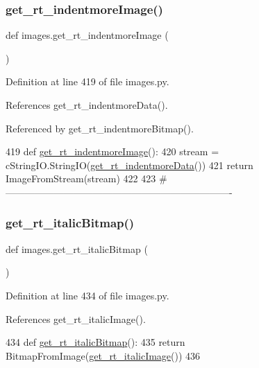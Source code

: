 \subsubsection{\texorpdfstring{get\+\_\+rt\+\_\+indentmore\+Image()}{get\_rt\_indentmoreImage()}}
{\footnotesize\ttfamily def images.\+get\+\_\+rt\+\_\+indentmore\+Image (\begin{DoxyParamCaption}{ }\end{DoxyParamCaption})}



Definition at line 419 of file images.\+py.



References get\+\_\+rt\+\_\+indentmore\+Data().



Referenced by get\+\_\+rt\+\_\+indentmore\+Bitmap().


\begin{DoxyCode}
419 \textcolor{keyword}{def }\hyperlink{namespaceimages_a8bfc6d18301fb3b884715866edaac635}{get\_rt\_indentmoreImage}():
420     stream = cStringIO.StringIO(\hyperlink{namespaceimages_a9f00d442ac6533725d70f75e8a0e7bde}{get\_rt\_indentmoreData}())
421     \textcolor{keywordflow}{return} ImageFromStream(stream)
422 
423 \textcolor{comment}{#----------------------------------------------------------------------}
\end{DoxyCode}
\mbox{\label{namespaceimages_accbbafcb62b12112266d9912021c8bac}} 
\subsubsection{\texorpdfstring{get\+\_\+rt\+\_\+italic\+Bitmap()}{get\_rt\_italicBitmap()}}
{\footnotesize\ttfamily def images.\+get\+\_\+rt\+\_\+italic\+Bitmap (\begin{DoxyParamCaption}{ }\end{DoxyParamCaption})}



Definition at line 434 of file images.\+py.



References get\+\_\+rt\+\_\+italic\+Image().


\begin{DoxyCode}
434 \textcolor{keyword}{def }\hyperlink{namespaceimages_accbbafcb62b12112266d9912021c8bac}{get\_rt\_italicBitmap}():
435     \textcolor{keywordflow}{return} BitmapFromImage(\hyperlink{namespaceimages_abb24502023e84e99516d15059c26371d}{get\_rt\_italicImage}())
436 
\end{DoxyCode}
\mbox{\label{namespaceimages_a912618bf10b2cb0da48f4e793c51fad0}} 
